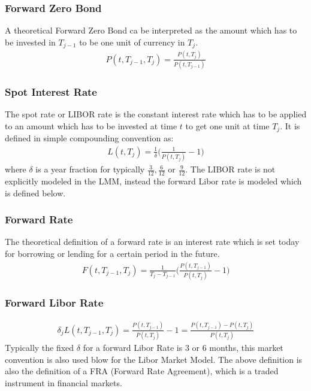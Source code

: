 \documentclass[11pt]{article}
\numberwithin{equation}{subsection}
\begin{document}
\subsubsection{Forward Zero Bond}
A theoretical Forward Zero Bond ca be interpreted as the amount which has to be invested in \(T_{j-1}\) to be one unit of currency in \(T_{j}\).
\begin{eqnarray}
	P(t, T_{j-1}, T_j) = \frac{P(t, T_j)}{P(t, T_{j-1})}
\end{eqnarray}	
\subsubsection{Spot Interest Rate}
The spot rate or LIBOR rate is the constant interest rate which has to be applied to an amount which has to be invested at time \(t\) to get one unit at time \(T_j\). It is defined in simple compounding convention as:
\begin{eqnarray}
L(t, T_j) = \frac{1}{\delta}\bigg(\frac{1}{P(t, T_j)}-1\bigg)
\end{eqnarray}	
where \(\delta\) is a year fraction for typically \(\frac{3}{12}, \frac{6}{12}\) or \(\frac{9}{12}\). The LIBOR rate is not explicitly modeled in the LMM, instead the forward Libor rate is modeled which is defined below. 
\subsubsection{Forward Rate}
The theoretical definition of a forward rate is an interest rate which is set today for borrowing or lending for a certain period in the future.
\begin{eqnarray}
	F(t, T_{j-1}, T_j) = \frac{1}{T_j-T_{j-1}}\bigg(\frac{P(t, T_{j-1})}{P(t, T_j)}-1\bigg)
\end{eqnarray}
\subsubsection{Forward Libor Rate}	
\begin{eqnarray}
\delta_{j} L(t, T_{j-1}, T_j) = \frac{P(t, T_{j-1})}{P(t, T_j)}-1 = \frac{P(t, T_{j-1})-P(t, T_{j})}{P(t, T_{j})}
\end{eqnarray}
Typically the fixed \(\delta\) for a forward Libor Rate is \(3\) or \(6\) months, this market convention is also used blow for the Libor Market Model. The above definition is also the definition of a FRA (Forward Rate Agreement), which is a traded instrument in financial markets.
\end{document}
